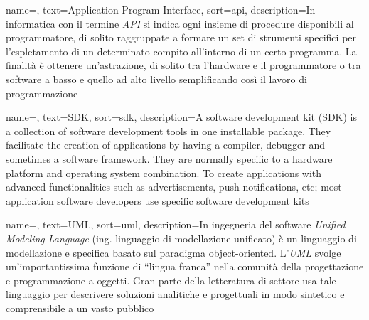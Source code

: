 





 {
    name=,
    text=Application Program Interface,
    sort=api,
    description={In informatica con il termine \emph{API} si indica ogni insieme di procedure disponibili al programmatore, di solito raggruppate a formare un set di strumenti specifici per l'espletamento di un determinato compito all'interno di un certo programma. La finalità è ottenere un'astrazione, di solito tra l'hardware e il programmatore o tra software a basso e quello ad alto livello semplificando così il lavoro di programmazione}
}

 {
    name=,
    text=SDK,
    sort=sdk,
    description={A software development kit (SDK) is a collection of software development tools in one installable package. They facilitate the creation of applications by having a compiler, debugger and sometimes a software framework. They are normally specific to a hardware platform and operating system combination. To create applications with advanced functionalities such as advertisements, push notifications, etc; most application software developers use specific software development kits}
}

 {
    name=,
    text=UML,
    sort=uml,
    description={In ingegneria del software \emph{Unified Modeling Language} (ing. linguaggio di modellazione unificato) è un linguaggio di modellazione e specifica basato sul paradigma object-oriented. L'\emph{UML} svolge un'importantissima funzione di ``lingua franca'' nella comunità della progettazione e programmazione a oggetti. Gran parte della letteratura di settore usa tale linguaggio per descrivere soluzioni analitiche e progettuali in modo sintetico e comprensibile a un vasto pubblico}
}


